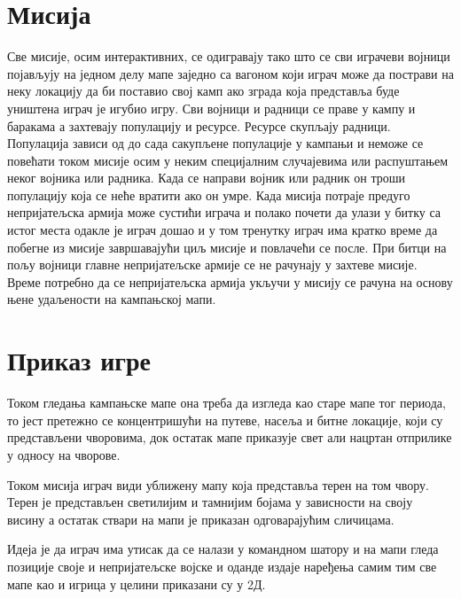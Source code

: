 \documentclass[11pt,a4paper]{report}
\begin{document}
\section{Мисија}
Све мисије, осим интерактивних, се одигравају тако што се сви играчеви војници појављују на једном делу мапе заједно са вагоном који играч може да пострави на неку локацију да би поставио свој камп ако зграда која представља буде уништена играч је игубио игру. Сви војници и радници се праве у кампу и баракама а захтевају популацију и ресурсе. Ресурсе скупљају радници. Популација зависи од до сада сакупљене популације  у кампањи и неможе се повећати током мисије осим у неким специјалним случајевима или распуштањем неког војника или радника. Када се направи војник или радник он троши популацију која се неће вратити ако он умре. Када мисија потраје предуго непријатељска армија може сустићи играча и полако почети да улази у битку са истог места одакле је играч дошао и у том тренутку играч има кратко време да побегне из мисије завршавајући циљ мисије и повлачећи се после. При битци на пољу војници главне непријатељске армије се не рачунају у захтеве мисије. Време потребно да се непријатељска армија укључи у мисију се рачуна на основу њене удаљености на кампањској мапи.

\section{Приказ игре}
Током гледања кампањске мапе она треба да изгледа као старе мапе тог периода, то јест претежно се концентришући на путеве, насеља и битне локације, који су представљени чворовима, док остатак мапе приказује свет али нацртан отприлике у односу на чворове.

Током мисија играч види уближену мапу која представља терен на том чвору. Терен је представљен светилијим и тамнијим бојама у зависности на своју висину а остатак ствари на мапи је приказан одговарајућим сличицама. 

Идеја је да играч има утисак да се налази у командном шатору и на мапи гледа позиције своје и непријатељске војске и оданде издаје наређења самим тим све мапе као и игрица у целини приказани су у 2Д.
\end{document}
